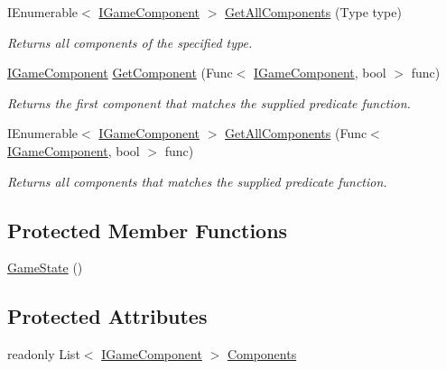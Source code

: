 \begin{DoxyCompactItemize}
I\-Enumerable$<$ \hyperlink{interface_tri_devs_1_1_tri_engine2_d_1_1_interfaces_1_1_i_game_component}{I\-Game\-Component} $>$ \hyperlink{class_tri_devs_1_1_tri_engine2_d_1_1_state_management_1_1_game_state_a8fa4417a8b9478dfec607a92270de936}{Get\-All\-Components} (Type type)
\begin{DoxyCompactList}\small\item\em Returns all components of the specified type. \end{DoxyCompactList}\item 
\hyperlink{interface_tri_devs_1_1_tri_engine2_d_1_1_interfaces_1_1_i_game_component}{I\-Game\-Component} \hyperlink{class_tri_devs_1_1_tri_engine2_d_1_1_state_management_1_1_game_state_a61f3c1e4d5cb7ad3e15b2bc8c79a0850}{Get\-Component} (Func$<$ \hyperlink{interface_tri_devs_1_1_tri_engine2_d_1_1_interfaces_1_1_i_game_component}{I\-Game\-Component}, bool $>$ func)
\begin{DoxyCompactList}\small\item\em Returns the first component that matches the supplied predicate function. \end{DoxyCompactList}\item 
I\-Enumerable$<$ \hyperlink{interface_tri_devs_1_1_tri_engine2_d_1_1_interfaces_1_1_i_game_component}{I\-Game\-Component} $>$ \hyperlink{class_tri_devs_1_1_tri_engine2_d_1_1_state_management_1_1_game_state_a177a6fd37f338568b7e72890bcf1f80f}{Get\-All\-Components} (Func$<$ \hyperlink{interface_tri_devs_1_1_tri_engine2_d_1_1_interfaces_1_1_i_game_component}{I\-Game\-Component}, bool $>$ func)
\begin{DoxyCompactList}\small\item\em Returns all components that matches the supplied predicate function. \end{DoxyCompactList}\end{DoxyCompactItemize}
\subsection*{Protected Member Functions}
\begin{DoxyCompactItemize}
\item 
\hyperlink{class_tri_devs_1_1_tri_engine2_d_1_1_state_management_1_1_game_state_a85c13247aa4ed19acf7ec750e4eb94df}{Game\-State} ()
\end{DoxyCompactItemize}
\subsection*{Protected Attributes}
\begin{DoxyCompactItemize}
\item 
readonly List$<$ \hyperlink{interface_tri_devs_1_1_tri_engine2_d_1_1_interfaces_1_1_i_game_component}{I\-Game\-Component} $>$ \hyperlink{class_tri_devs_1_1_tri_engine2_d_1_1_state_management_1_1_game_state_ab1ea74d5e4192c58474a485bf162fd67}{Components}
\end{DoxyCompactItemize}
